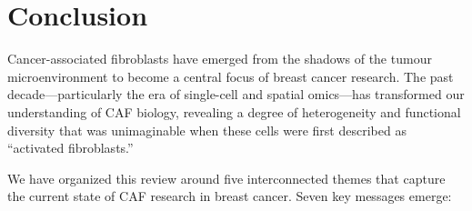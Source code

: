 \section{Conclusion}
\label{sec:conclusion}

Cancer-associated fibroblasts have emerged from the shadows of the tumour microenvironment to become a central focus of breast cancer research. The past decade---particularly the era of single-cell and spatial omics---has transformed our understanding of CAF biology, revealing a degree of heterogeneity and functional diversity that was unimaginable when these cells were first described as ``activated fibroblasts.''

We have organized this review around five interconnected themes that capture the current state of CAF research in breast cancer. Seven key messages emerge:

